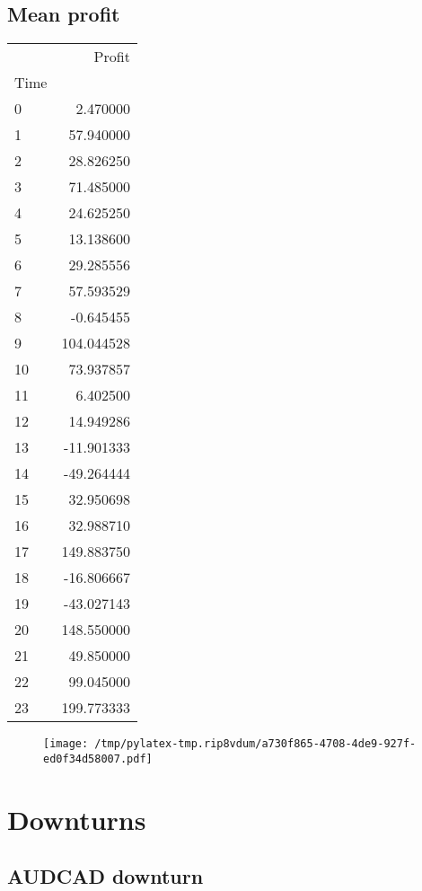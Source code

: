 \documentclass{article}%
\begin{document}
\subsection{Mean profit }%
\label{subsec:Meanprofit}%
\begin{tabular}{lr}
\toprule
{} &      Profit \\
Time &             \\
\midrule
0    &    2.470000 \\
1    &   57.940000 \\
2    &   28.826250 \\
3    &   71.485000 \\
4    &   24.625250 \\
5    &   13.138600 \\
6    &   29.285556 \\
7    &   57.593529 \\
8    &   -0.645455 \\
9    &  104.044528 \\
10   &   73.937857 \\
11   &    6.402500 \\
12   &   14.949286 \\
13   &  -11.901333 \\
14   &  -49.264444 \\
15   &   32.950698 \\
16   &   32.988710 \\
17   &  149.883750 \\
18   &  -16.806667 \\
19   &  -43.027143 \\
20   &  148.550000 \\
21   &   49.850000 \\
22   &   99.045000 \\
23   &  199.773333 \\
\bottomrule
\end{tabular}
%


\begin{figure}[htbp]%
\centering%
\texttt{[image: /tmp/pylatex-tmp.rip8vdum/a730f865-4708-4de9-927f-ed0f34d58007.pdf]}%
\end{figure}

%
\newpage %
\section{Downturns}%
\label{sec:Downturns}%
\subsection{AUDCAD downturn}%
\label{subsec:AUDCADdownturn}%
\end{document}
